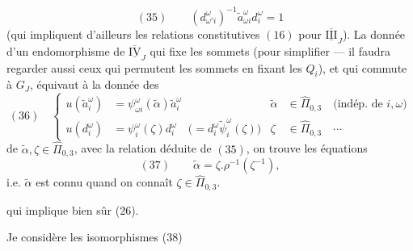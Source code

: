 \[
(35)\qquad(d_{\omega'i}^\omega)^{-1}\widetilde a_{\omega i}^{\omega}d_i^\omega=1
\]
(qui impliquent d'ailleurs les relations constitutives $(16)$ pour $\overline{\underline{\mathrm{III}}}_J$). La donnée d'un endomorphisme de $\overline{\underline{\mathrm{IV}}}_J$ qui fixe les  sommets (pour simplifier --- il faudra regarder aussi ceux qui permutent les sommets  en fixant les $Q_i$),  et qui commute à $G_J$, équivaut à la donnée des
\[
(36)\quad\left\{\begin{aligned}
u(\widetilde a_i^\omega)&=\psi_{\omega i}^\omega(\widetilde\alpha)\widetilde a_i^\omega
&\widetilde\alpha&\in\widehat\Pi_{0,3}\quad\text{(indép. de }i,\omega\text{)}\\
u(d_i^\omega)&=\psi_i^\omega(\zeta)d_i^\omega\quad\bigl(=d_i^\omega\widetilde\psi_i^\omega(\zeta)\bigr)
&\zeta&\in\widehat\Pi_{0,3}\quad\cdots
\end{aligned}\right.
\]
de $\widetilde\alpha,\zeta\in\widehat\Pi_{0,3}$, avec la relation déduite de $(35)$, on trouve les équations
\[
(37)\qquad\widetilde\alpha=\zeta.\rho^{-1}(\zeta^{-1}),
\]
i.e. $\widetilde\alpha$ est connu quand on connaît $\zeta\in\widehat\Pi_{0,3}$.

qui implique bien sûr (26).

Je  considère les isomorphismes
\quad(38)

